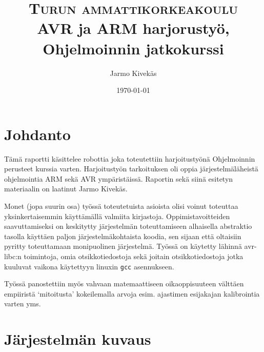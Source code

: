 \documentclass[]{article} %
\title{	
\normalfont \normalsize 
\textsc{Turun ammattikorkeakoulu} \\ [25pt] %
\huge AVR ja ARM harjorustyö, Ohjelmoinnin jatkokurssi\\ %
}
\author{
Jarmo Kivekäs
}
\date{\normalsize\today} %
\numberwithin{equation}{section}
\numberwithin{figure}{section}
\numberwithin{table}{section}
\begin{document}
\maketitle
\tableofcontents

\newpage












\section{Johdanto}
\label{sec:Johdanto}


Tämä raportti käsittelee robottia joka toteutettiin harjoitustyönä Ohjelmoinnin perusteet kurssia varten.
Harjoitustyön tarkoituksen oli oppia järjestelmäläheistä ohjelmointia ARM sekä AVR ympäristäissä.
Raportin sekä siinä esitetyn materiaalin on laatinut Jarmo Kivekäs.

Monet (jopa suurin osa) työssä toteutetuista asioista olisi voinut toteuttaa yksinkertaisemmin käyttämällä valmiita kirjastoja. Oppimistavoitteiden saavuttamiseksi on keskitytty järjestelmän toteuttamiseen alhaisella abstraktio tasolla käyttäen paljon järjestelmäkohtaista koodia, sen sijaan että oltaisiin pyritty toteuttamaan monipuolinen järjestelmä. Työssä on käytetty lähinnä avr-libc:n toimintoja, omia otsikkotiedostoja sekä joitain otsikkotiedostoja jotka kuuluvat vaikona käytettyyn linuxin \verb+gcc+ asennukseen.

Työssä panostettiin myös vahvaan matemaattiseen oikaoppisuuteen välttäen empiiristä `mitoitusta' kokeilemalla arvoja esim. ajastimen esijakajan kalibrointia varten yms.

\section{Järjestelmän kuvaus}
\label{sec:Jarjestelma kuvaus}
\end{document}
